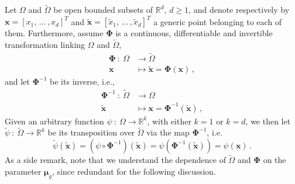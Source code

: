 \documentclass[12pt, a4paper, twoside, openright]{report}
\numberwithin{equation}{chapter}
\theoremstyle{theorem}
\theoremstyle{definition}
\theoremstyle{remark}
\theoremstyle{proposition}
\numberwithin{figure}{chapter}
\newcommand{\wt}[1]{\widetilde{#1}}
\newcommand{\bg}[1]{\boldsymbol{#1}}
\begin{document}
		Let $\Omega$ and $\wt{\Omega}$ be open bounded subsets of $\mathbb{R}^d$, $d \geq 1$, and denote respectively by $\bg{x} = [x_1, \, \ldots \, , x_d]^T$ and $\wt{\bg{x}} = [\wt{x}_1, \, \ldots \, , \wt{x}_d]^T$ a generic point belonging to each of them. Furthermore, assume $\bg{\Phi}$ is a continuous, differentiable and invertible transformation linking $\Omega$ and $\wt{\Omega}$,
		\begin{equation*}
			\begin{aligned}
				\bg{\Phi} ~ : ~ \Omega & \rightarrow \wt{\Omega} \\
				\bg{x} & \mapsto \wt{\bg{x}} = \bg{\Phi}(\bg{x}) \, , 
			\end{aligned}
		\end{equation*}
		and let $\bg{\Phi}^{-1}$ be its inverse, i.e.,
		\begin{equation*}
			\begin{aligned}
				\bg{\Phi}^{-1} ~ : ~ \wt{\Omega} & \rightarrow \Omega \\
				\wt{\bg{x}} & \mapsto \bg{x} = \bg{\Phi}^{-1}(\wt{\bg{x}}) \, , 
			\end{aligned}
		\end{equation*}
		Given an arbitrary function $\psi ~ : ~ \Omega \rightarrow \mathbb{R}^k$, with either $k = 1$ or $k = d$, we then let $\wt{\psi} ~ : ~ \wt{\Omega} \rightarrow \mathbb{R}^k$ be its transposition over $\wt{\Omega}$ via the map $\bg{\Phi}^{-1}$, i.e.
		\begin{equation*}
			\wt{\psi}(\wt{\bg{x}}) = (\psi \circ \bg{\Phi}^{-1})(\wt{\bg{x}}) = \psi(\bg{\Phi}^{-1}(\wt{\bg{x}})) = \psi(\bg{x}) \, .
		\end{equation*}
		As a side remark, note that we understand the dependence of $\wt{\Omega}$ and $\bg{\Phi}$ on the parameter $\bg{\mu}_g$, since redundant for the following discussion.
		
\end{document}
